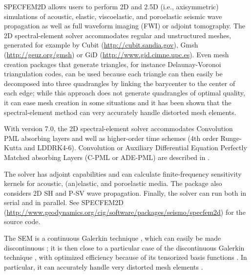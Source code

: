 \documentclass[oneside,english,onecolumn,letterpaper]{book}
\newcommand{\urlwithparentheses}[1]{(\url{#1})}
\begin{document}

SPECFEM2D allows users to perform 2D and 2.5D (i.e., axisymmetric) simulations of
acoustic, elastic, viscoelastic, and poroelastic seismic wave propagation
as well as full waveform imaging (FWI) or adjoint tomography.
The 2D spectral-element solver accommodates
regular and unstructured meshes, generated for example by Cubit
\urlwithparentheses{http://cubit.sandia.gov},
Gmsh \urlwithparentheses{http://geuz.org/gmsh}
or GiD \urlwithparentheses{http://www.gid.cimne.upc.es}.
Even mesh creation packages that generate triangles, for instance Delaunay-Voronoi triangulation codes, can be used because each triangle can then easily be decomposed into three quadrangles by linking the barycenter to the center of each edge; while this approach does not generate quadrangles of optimal quality, it can ease mesh creation in some situations and it has been shown that the spectral-element method can very accurately handle distorted mesh elements.

With version 7.0, the 2D spectral-element solver accommodates Convolution PML absorbing layers and well as higher-order time schemes
(4th order Runge-Kutta and LDDRK4-6).
Convolution or Auxiliary Differential Equation Perfectly Matched absorbing Layers (C-PML or ADE-PML)
are described in \cite{MaKoEz08,MaKoGe08,MaKo09,MaKoGeBr10,KoMa07}.

The solver has adjoint capabilities and can
calculate finite-frequency sensitivity kernels \citep{TrKoLi08,PeKoLuMaLeCaLeMaLiBlNiBaTr11} for acoustic,
(an)elastic, and poroelastic media. The package also considers 2D SH
and P-SV wave propagation. Finally, the solver can run
both in serial and in parallel. See SPECFEM2D
\urlwithparentheses{http://www.geodynamics.org/cig/software/packages/seismo/specfem2d}
for the source code.

The SEM is a continuous Galerkin technique \citep{TrKoLi08,PeKoLuMaLeCaLeMaLiBlNiBaTr11}, which can easily be made discontinuous \citep{BeMaPa94,Ch00,KoWoHu02,ChCaVi03,LaWaBe05,Kop06,WiStBuGh10,AcKo11}; it is then close to a particular case of the discontinuous Galerkin technique \citep{ReHi73,LeRa74,Arn82,JoPi86,BoMaHe91,FaRi99,HuHuRa99,CoKaSh00,GiHeWa02,RiWh03,MoRi05,GrScSc06,AiMoMu06,BeLaPi06,DuKa06,DeSeWh08,PuAmKa09,WiStBuGh10,DeSe10,EtChViGl10}, with optimized efficiency because of its tensorized basis functions \citep{WiStBuGh10,AcKo11}.
In particular, it can accurately handle very distorted mesh elements \citep{OlSe11}.
\end{document}
